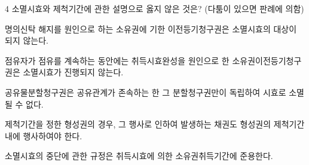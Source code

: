\begin{question}{4}
소멸시효와 제척기간에 관한 설명으로 옳지 않은 것은? (다툼이 있으면 판례에 의함)
\begin{choices}
  \item 명의신탁 해지를 원인으로 하는 소유권에 기한 이전등기청구권은 소멸시효의 대상이 되지 않는다.
  \item 점유자가 점유를 계속하는 동안에는 취득시효완성을 원인으로 한 소유권이전등기청구권은 소멸시효가 진행되지 않는다.
  \item 공유물분할청구권은 공유관계가 존속하는 한 그 분할청구권만이 독립하여 시효로 소멸될 수 없다.
  \item 제척기간을 정한 형성권의 경우, 그 행사로 인하여 발생하는 채권도 형성권의 제척기간 내에 행사하여야 한다.
  \item 소멸시효의 중단에 관한 규정은 취득시효에 의한 소유권취득기간에 준용한다.
\end{choices}
\end{question}
